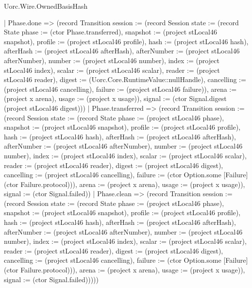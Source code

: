 \begin{lexlean}{Uorc.Wire.OwnedBasisHash}
\begin{semanticmodule}
{      | Phase.done => (record Transition {session := (record Session {state := (record State {phase := (ctor Phase.transferred), snapshot := (project stLocal46 snapshot), profile := (project stLocal46 profile), hash := (project stLocal46 hash), afterHash := (project stLocal46 afterHash), afterNumber := (project stLocal46 afterNumber), number := (project stLocal46 number), index := (project stLocal46 index), scalar := (project stLocal46 scalar), reader := (project stLocal46 reader), digest := (Uorc.Core.RuntimeValue::nullHandle), cancelling := (project stLocal46 cancelling), failure := (project stLocal46 failure)}), arena := (project x arena), usage := (project x usage)}), signal := (ctor Signal.digest (project stLocal46 digest))})
      | Phase.transferred => (record Transition {session := (record Session {state := (record State {phase := (project stLocal46 phase), snapshot := (project stLocal46 snapshot), profile := (project stLocal46 profile), hash := (project stLocal46 hash), afterHash := (project stLocal46 afterHash), afterNumber := (project stLocal46 afterNumber), number := (project stLocal46 number), index := (project stLocal46 index), scalar := (project stLocal46 scalar), reader := (project stLocal46 reader), digest := (project stLocal46 digest), cancelling := (project stLocal46 cancelling), failure := (ctor Option.some [Failure] (ctor Failure.protocol))}), arena := (project x arena), usage := (project x usage)}), signal := (ctor Signal.failed)})
      | Phase.clean => (record Transition {session := (record Session {state := (record State {phase := (project stLocal46 phase), snapshot := (project stLocal46 snapshot), profile := (project stLocal46 profile), hash := (project stLocal46 hash), afterHash := (project stLocal46 afterHash), afterNumber := (project stLocal46 afterNumber), number := (project stLocal46 number), index := (project stLocal46 index), scalar := (project stLocal46 scalar), reader := (project stLocal46 reader), digest := (project stLocal46 digest), cancelling := (project stLocal46 cancelling), failure := (ctor Option.some [Failure] (ctor Failure.protocol))}), arena := (project x arena), usage := (project x usage)}), signal := (ctor Signal.failed)}))))
}


\end{semanticmodule}
\end{lexlean}
